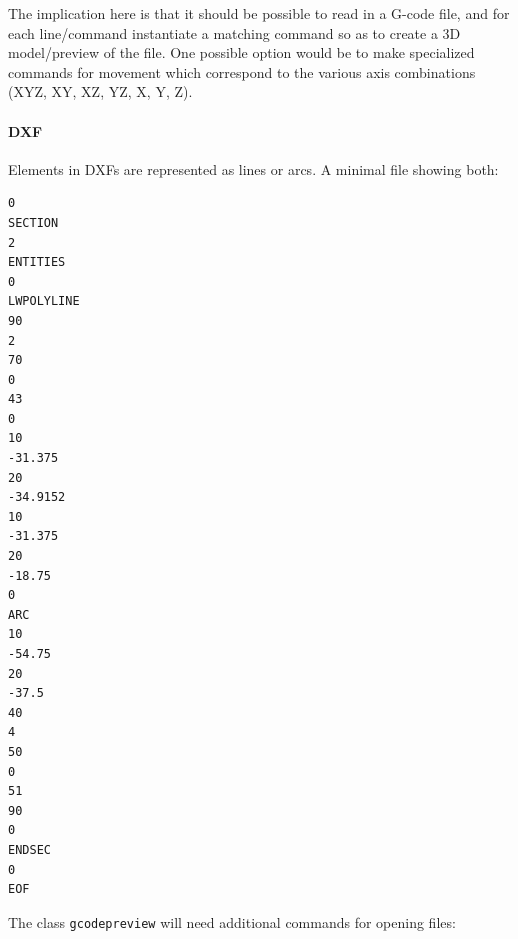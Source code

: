 \documentclass{ltxdoc}
\begin{document}
The implication here is that it should be possible to read in a G-code file, and for each line/\allowbreak command instantiate a matching command so as to create a 3D model/preview  of the file. One possible option would be to make specialized commands for movement which correspond to the various axis combinations (XYZ, XY, XZ, YZ, X, Y, Z).

\paragraph{DXF}

Elements in DXFs are represented as lines or arcs. A minimal file showing both:

\begin{verbatim}
0
SECTION
2
ENTITIES
0
LWPOLYLINE
90
2
70
0
43
0
10
-31.375
20
-34.9152
10
-31.375
20
-18.75
0
ARC
10
-54.75
20
-37.5
40
4
50
0
51
90
0
ENDSEC
0
EOF
\end{verbatim}

The class \verb|gcodepreview| will need additional commands for opening files:
\end{document}

